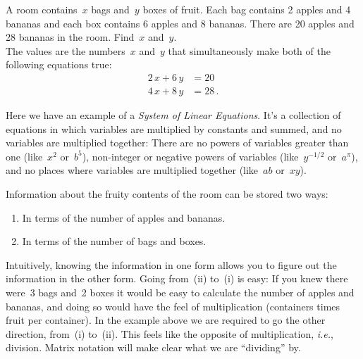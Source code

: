 \begin{example} 
A room contains~$x$ bags and~$y$ boxes of fruit. 
Each bag contains 2 apples and 4 bananas and each box contains 6 apples and 8 bananas. 
There are 20 apples and 28 bananas in the room. Find~$x$ and~$y$.
\\


\noindent
The values are the numbers~$x$ and~$y$ that simultaneously make both of the following equations true:
\begin{align*}
	2\, x + 6\, y & =  20 \\
	4\, x + 8\, y & = 28\, .
\end{align*}
\end{example}
Here we have an example of a \emph{System of Linear Equations}.  It's a collection of equations in which variables are multiplied by constants and summed, and no variables are multiplied together:  There are no powers of variables greater than one (like~$x^2$ or~$b^5$), non-integer or negative powers of variables (like~$y^{-1/2}$ or~$a^{\pi}$), and no places where variables are multiplied together (like~$ab$ or~$xy$).

%
\noindent
Information about the fruity contents of the room can be stored two ways: 
\begin{enumerate}\renewcommand{\theenumi}{(\roman*{enumi})}
\item In terms of the number of apples and bananas. 
\item In terms of the number of bags and boxes. 
\end{enumerate}
Intuitively, knowing the information in one form allows you to figure out the information in the other form. 
Going from~(ii) to~(i) is easy: 
If you knew there were~3 bags and~2 boxes it would be easy to calculate the number of apples and bananas, and doing so would have the feel of multiplication (containers times fruit per container). 
In the example above we are required to go the other direction, from~(i) to~(ii). This  feels like the opposite of multiplication, {\itshape i.e.}, division. Matrix notation will 
make clear what we are ``dividing'' by. 

